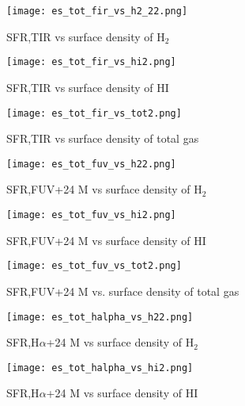 \documentclass[useAMS,usenatbib]{mn2e}
\begin{document}
\begin{figure*}
    \centering
    \begin{subfigure}[b]{0.3\textwidth}
        \centering
        \texttt{[image: es\_tot\_fir\_vs\_h2\_22.png]}
        \caption{SFR,TIR vs surface density of H$_2$}
        \label{fig:es,all,fir,h2}
    \end{subfigure}
    \hfill
    \begin{subfigure}[b]{0.3\textwidth}
        \centering
        \texttt{[image: es\_tot\_fir\_vs\_hi2.png]}
        \caption{SFR,TIR vs surface density of HI}
        \label{fig:es,all,fir,hi}
    \end{subfigure}
    \hfill
   \begin{subfigure}[b]{0.3\textwidth}
        \centering
        \texttt{[image: es\_tot\_fir\_vs\_tot2.png]}
        \caption{SFR,TIR vs surface density of total gas}
        \label{fig:es,all,fir,tot}
    \end{subfigure}
    \hfill
     \begin{subfigure}[b]{0.3\textwidth}
        \centering
        \texttt{[image: es\_tot\_fuv\_vs\_h22.png]}
        \caption{SFR,FUV+24 M vs surface density of H$_2$}
        \label{fig:es,all,fuv,h2}
    \end{subfigure}
     \hfill
   \begin{subfigure}[b]{0.3\textwidth}
        \centering
        \texttt{[image: es\_tot\_fuv\_vs\_hi2.png]}
        \caption{SFR,FUV+24 M vs surface density of HI}
        \label{fig:es,all,fuv,hi}
    \end{subfigure}
    \hfill
    \begin{subfigure}[b]{0.3\textwidth}
        \centering
        \texttt{[image: es\_tot\_fuv\_vs\_tot2.png]}
        \caption{SFR,FUV+24 M vs. surface density of total gas}
        \label{fig:es,all,fuv,tot}
    \end{subfigure}
    \hfill
     \begin{subfigure}[b]{0.3\textwidth}
        \centering
        \texttt{[image: es\_tot\_halpha\_vs\_h22.png]}
        \caption{SFR,H$\alpha$+24 M vs surface density of H$_2$}
        \label{fig:es,all,halpha,h2}
    \end{subfigure}
     \hfill
   \begin{subfigure}[b]{0.3\textwidth}
        \centering
        \texttt{[image: es\_tot\_halpha\_vs\_hi2.png]}
        \caption{SFR,H$\alpha$+24 M vs surface density of HI}

\end{subfigure}
\end{figure*}
\end{document}
